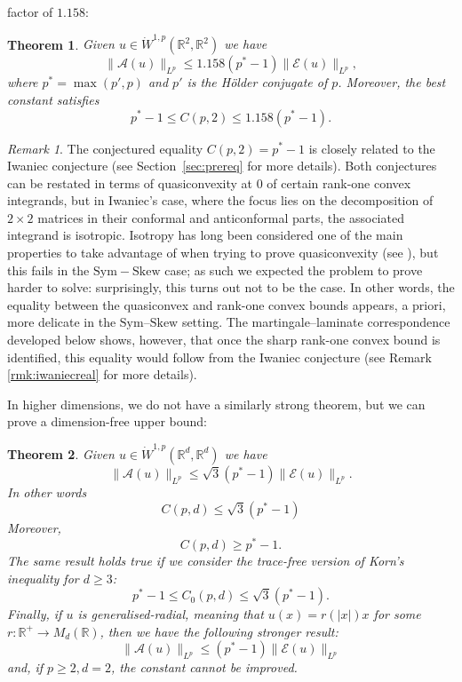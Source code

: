 \documentclass[11pt, a4paper]{amsart}
\newtheorem{theorem}{Theorem}[section]
\theoremstyle{definition}
\theoremstyle{remark}
\newtheorem{remark}{Remark}
\newcommand{\R}{\mathbb{R}}
\begin{document}
factor of $1.158$:
\begin{theorem}\label{thm:Korn2d}
    Given $u\in \dot{W}^{1,p}(\R^2, \R^2)$ we have
\begin{equation*}
    \|\mathcal A (u)\|_{L^p}\le 
    1.158(p^*-1)\|\mathcal E(u)\|_{L^p},
\end{equation*}
where $p^*=\max(p',p)$ and $p'$ is the
Hölder conjugate of $p$. Moreover, the best constant
satisfies
    \begin{equation}
        p^*-1\le C(p,2)\le 1.158(p^*-1).
    \end{equation}
\end{theorem}
\begin{remark}
    The conjectured equality $C(p,2)=p^*-1$ is closely
    related to the Iwaniec conjecture (see
    Section~\ref{sec:prereq} for more details).
    Both conjectures can be restated in terms of quasiconvexity at $0$
    of certain rank-one convex integrands, but in Iwaniec's case, where the focus lies on the decomposition of 
     $2\times 2$ matrices in
    their conformal and anticonformal parts, the associated
    integrand is isotropic. Isotropy has long been 
    considered one of the main properties to take advantage
    of when trying to prove quasiconvexity (see \cite{Guerra2022}), but 
    this fails in the 
    $\mathrm{Sym}-\mathrm{Skew}$ case; as such we expected 
    the problem to prove harder to solve: surprisingly, this turns out not to be the case. In other words, the equality between the quasiconvex and
rank-one convex bounds appears, a priori, more delicate in the
$\mathrm{Sym}$--$\mathrm{Skew}$ setting. The
martingale--laminate correspondence developed below shows,
however, that once the sharp rank-one convex bound is identified,
this equality would follow from the Iwaniec conjecture (see Remark \ref{rmk:iwaniecreal}
for more details).
\end{remark}
In higher dimensions, we do not have a similarly
strong theorem, but we can prove a dimension-free
upper bound:
\begin{theorem}\label{thm:Korn}
Given $u\in \dot{W}^{1,p}(\R^d, \R^d)$ we have
\begin{equation*}
    \|\mathcal A (u)\|_{L^p}\le 
    \sqrt 3(p^*-1)\|\mathcal E(u)\|_{L^p}.
\end{equation*}
In other words
\begin{equation}
C(p,d)\le \sqrt 3(p^*-1)
\end{equation}
Moreover, 
\begin{equation}
C(p,d)\ge p^*-1.
\end{equation}
The same result holds true if we consider the
trace-free version of Korn's inequality for $d\ge 3$:
\begin{equation}
    p^*-1\le C_0(p,d)\le \sqrt{3}(p^*-1).
\end{equation}
Finally, if $u$ is generalised-radial,
meaning that $u(x)=r(|x|)x$ for some
$r\colon\mathbb{R}^+\to M_d(\mathbb{R})$, then
we have the following stronger result:
\begin{equation}
\|\mathcal A(u)\|_{L^p}
\le (p^*-1)\|\mathcal E(u)\|_{L^p}
\end{equation}
and, if $p\ge 2, d=2$, the constant cannot be improved.
\end{theorem}
\end{document}
